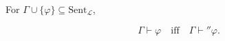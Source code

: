 For $\Gamma \cup \{\varphi\} \subseteq \text{Sent}_{\mathcal{L}}$,

$$\Gamma \vdash \varphi \quad \text{iff} \quad \Gamma \vdash'' \varphi.$$
